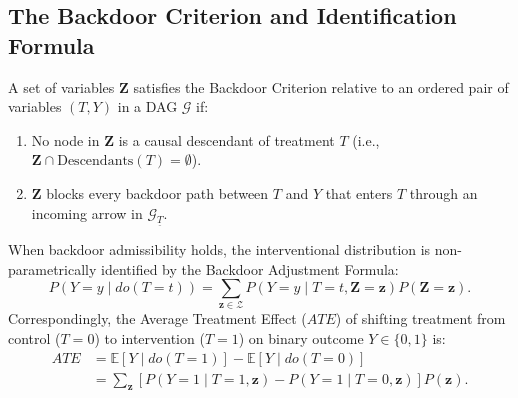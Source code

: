 \subsection{The Backdoor Criterion and Identification Formula}

\begin{definition}
A set of variables $\mathbf{Z}$ satisfies the Backdoor Criterion relative to an ordered pair of variables $(T, Y)$ in a DAG $\mathcal{G}$ if:
\begin{enumerate}
    \item No node in $\mathbf{Z}$ is a causal descendant of treatment $T$ (i.e., $\mathbf{Z} \cap \text{Descendants}(T) = \emptyset$).
    \item $\mathbf{Z}$ blocks every backdoor path between $T$ and $Y$ that enters $T$ through an incoming arrow in $\mathcal{G}_{\underline{T}}$.
\end{enumerate}
\end{definition}

When backdoor admissibility holds, the interventional distribution is non-parametrically identified by the Backdoor Adjustment Formula:
\begin{equation}
    P(Y = y \mid do(T = t)) = \sum_{\mathbf{z} \in \mathcal{Z}} P(Y = y \mid T = t, \mathbf{Z} = \mathbf{z}) P(\mathbf{Z} = \mathbf{z}).
    \label{eq:backdoor_adjustment}
\end{equation}
Correspondingly, the Average Treatment Effect ($ATE$) of shifting treatment from control ($T=0$) to intervention ($T=1$) on binary outcome $Y \in \{0, 1\}$ is:
\begin{equation}
\begin{aligned}
    ATE &= \mathbb{E}[Y \mid do(T=1)] - \mathbb{E}[Y \mid do(T=0)] \\
        &= \sum_{\mathbf{z}} \left[ P(Y=1 \mid T=1, \mathbf{z}) - P(Y=1 \mid T=0, \mathbf{z}) \right] P(\mathbf{z}).
\end{aligned}
\label{eq:ate_definition}
\end{equation}
